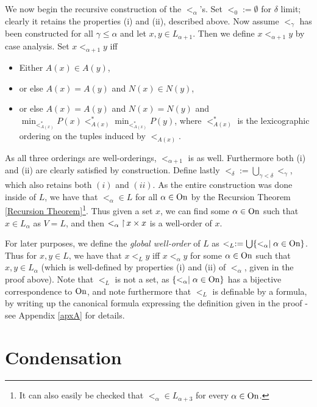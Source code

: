 {We now begin the recursive construction of the $<_\alpha$'s. Set $<_0:=\emptyset$ for $\delta$ limit; clearly it retains the properties (i) and (ii), described above. Now assume $<_\gamma$ has been constructed for all $\gamma\leq\alpha$ and let $x,y\in L_{\alpha+1}$. Then we define $x<_{\alpha+1}y$ by case analysis. Set $x<_{\alpha+1}y$ iff
\begin{itemize}
\item Either $A(x)\in A(y)$,
\item or else $A(x)=A(y)$ and $N(x)\in N(y)$,
\item or else $A(x)=A(y)$ and $N(x)=N(y)$ and $\min_{<_{A(x)}^*} P(x)<_{A(x)}^*\min_{<_{A(x)}^*} P(y)$, where $<_{A(x)}^*$ is the lexicographic ordering on the tuples induced by $<_{A(x)}$.\\
\end{itemize}

As all three orderings are well-orderings, $<_{\alpha+1}$ is as well. Furthermore both (i) and (ii) are clearly satisfied by construction. Define lastly $<_\delta:=\bigcup_{\gamma<\delta}<_\gamma$, which also retains both $(i)$ and $(ii)$. As the entire construction was done inside of $L$, we have that $<_\alpha\in L$ for all $\alpha\in\operatorname{On}$ by the Recursion Theorem \ref{Recursion Theorem}\footnote{It can also easily be checked that $<_\alpha\in L_{\alpha+3}$ for every $\alpha\in\operatorname{On}$.}. Thus given a set $x$, we can find some $\alpha\in\operatorname{On}$ such that $x\in L_\alpha$ as $V{=}L$, and then $<_\alpha\operatorname{\upharpoonright} x\times x$ is a well-order of $x$.
}

For later purposes, we define the \textit{global well-order} of $L$ as $<_L:=\bigcup\{<_\alpha\mid\alpha\in\operatorname{On}\}$. Thus for $x,y\in L$, we have that $x<_L y$ iff $x<_\alpha y$ for some $\alpha\in\operatorname{On}$ such that $x,y\in L_\alpha$ (which is well-defined by properties (i) and (ii) of $<_\alpha$, given in the proof above). Note that $<_L$ is not a set, as $\{<_\alpha\mid\alpha\in\operatorname{On}\}$ has a bijective correspondence to $\operatorname{On}$, and note furthermore that $<_L$ is definable by a formula, by writing up the canonical formula expressing the definition given in the proof - see Appendix \ref{apxA} for details.\\


\section{Condensation}

